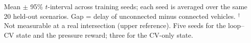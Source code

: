 \begin{table}[t]
\vspace{2pt}
{\footnotesize Mean $\pm$ 95\% $t$-interval across training seeds; each seed is averaged over the same 20 held-out scenarios. Gap = delay of unconnected minus connected vehicles. $^\dagger$Not measurable at a real intersection (upper reference). Five seeds for the loop--CV state and the pressure reward; three for the CV-only state.}
\end{table}
